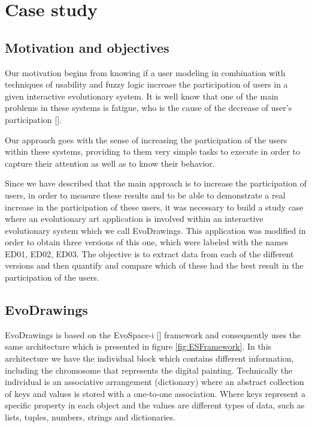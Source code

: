 \chapter{Case study} \label{sec:4}




\section{Motivation and objectives}

Our motivation begins from knowing if a user modeling in combination with
techniques of usability and fuzzy logic increase the participation of users in a
given interactive evolutionary system. It is well know that one of the main
problems in these systems is fatigue, who is the cause of the decrease of user's
participation [].

Our approach goes with the sense of increasing the participation of the users
within these systems, providing to them very simple tasks to execute in order to
capture their attention as well as to know their behavior.

Since we have described that the main approach is to increase the participation
of users, in order to measure these results and to be able to demonstrate a real
increase in the participation of these users, it was necessary to build a study
case where an evolutionary art application is involved within an interactive
evolutionary system which we call EvoDrawings. This application was modified in
order to obtain three versions of this one, which were labeled with the names
ED01, ED02, ED03. The objective is to extract data from each of the different
versions and then quantify and compare which of these had the best result in the
participation of the users.

\section{EvoDrawings} EvoDrawings is based on the EvoSpace-i [] framework and
consequently uses the same architecture which is presented in figure
\ref{fig:ESFramework}. In this architecture we have the individual block which
contains different information, including the chromosome that represents the
digital painting. Technically the individual is an associative arrangement
(dictionary) where an abstract collection of keys and values is stored with a
one-to-one association. Where keys represent a specific property in each object
and the values are different types of data, such as lists, tuples, numbers,
strings and dictionaries.

